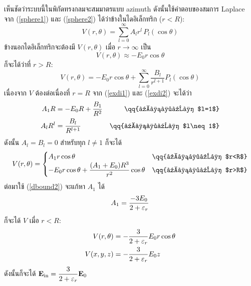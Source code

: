 \begin{soln}
เห็นชัดว่าระบบนี้ในพิกัดทรงกลมจะสมมาตรแบบ azimuth ดังนั้นใช้คำตอบของสมการ Laplace จาก (\ref{sphere1}) และ (\ref{sphere2}) ได้ว่าข้างในไดอิเล็กทริก ($r<R$):
\begin{equation}
    V(r,\theta)=\sum_{l=0}^\infty A_lr^l\,P_l(\cos\theta)\tag{$\star$1}\label{exdi1}
\end{equation}
ข้างนอกไดอิเล็กทริกจะต้องมี $V(r,\theta)$ เมื่อ $r\to\infty$ เป็น
\[
V(r,\theta)\approx -E_0r\cos\theta
\]
ก็จะได้ว่าที่ $r>R$:
\begin{equation}
    V(r,\theta)=-E_0r\cos\theta+\sum_{l=0}^\infty \frac{B_l}{r^{l+1}}P_l(\cos\theta)\tag{$\star$2}\label{exdi2}
\end{equation}
เนื่องจาก $V$ ต้องต่อเนื่องที่ $r=R$ จาก (\ref{exdi1}) และ (\ref{exdi2}) จะได้ว่า
\begin{alignat*}{2}
    A_1R&=-E_0R+\dfrac{B_1}{R^2}&\qq{เมื่อ $l=1$}\\
    A_lR^l&=\dfrac{B_l}{R^{l+1}}&\qq{เมื่อ $l\neq1$}
\end{alignat*}
ดังนั้น $A_l=B_l=0$ สำหรับทุก $l\neq 1$ ก็จะได้
\[
V(r,\theta)=\begin{cases}
    A_1r\cos\theta&\qq{เมื่อ $r<R$}\\
    -E_0r\cos\theta+\dfrac{(A_1+E_0)R^3}{r^2}\cos\theta&\qq{เมื่อ $r>R$}
\end{cases}
\]
ต่อมาใช้ (\ref{dbound2}) จะแก้หา $A_1$ ได้
\[
A_1=\frac{-3E_0}{2+\varepsilon_r}
\]
ก็จะได้ $V$ เมื่อ $r<R$:
\begin{align*}
    V(r,\theta)&=-\frac{3}{2+\varepsilon_r}E_0r\cos\theta\\
    V(x,y,z)&=-\frac{3}{2+\varepsilon_r}E_0z
\end{align*}
ดังนั้นก็จะได้ $\mathbf{E}_{\mathrm{in}}=\dfrac{3}{2+\varepsilon_r}\mathbf{E}_0$
\end{soln}
